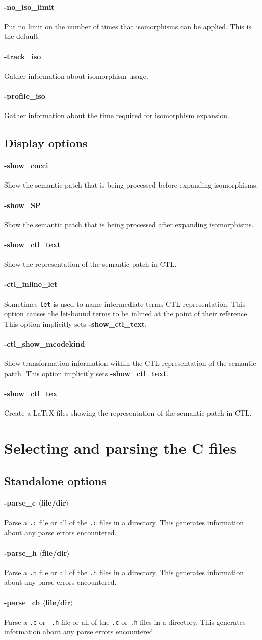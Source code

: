 \documentclass{article}
\newcommand{\normal}[2]{\paragraph*{\makebox[0in][r]{\BigLowerDiamond\,\,} {{#1}}} {#2}}
\newcommand{\rare}[2]{\paragraph*{\makebox[0in][r]{\BigDiamondshape\,\,} {{#1}}} {#2}}
\newcommand{\developer}[2]{\paragraph*{{#1}} {#2}}
\begin{document}
\rare{-no\_iso\_limit} Put no limit on the number of times that
isomorphisms can be applied. This is the default.

\developer{-track\_iso}{ Gather information about isomorphism usage.}

\developer{-profile\_iso}{ Gather information about the time required for
isomorphism expansion.}

\subsection{Display options}

\rare{-show\_cocci}{Show the semantic patch that is being processed before
  expanding isomorphisms.}

\rare{-show\_SP}{Show the semantic patch that is being processed after
  expanding isomorphisms.}

\rare{-show\_ctl\_text}{ Show the representation
of the semantic patch in CTL.}

\rare{-ctl\_inline\_let}{ Sometimes {\tt let} is used to name
intermediate terms CTL representation.  This option causes the let-bound
terms to be inlined at the point of their reference.
This option implicitly sets {\bf -show\_ctl\_text}.}

\rare{-ctl\_show\_mcodekind}{ Show
transformation information within the CTL representation
of the semantic patch. This option implicitly sets {\bf -show\_ctl\_text}.}

\rare{-show\_ctl\_tex}{ Create a LaTeX files showing the representation
of the semantic patch in CTL.}

\section{Selecting and parsing the C files}

\subsection{Standalone options}

\normal{-parse\_c $\langle$file/dir$\rangle$}{ Parse a {\tt .c} file or all
  of the {\tt .c} files in a directory.  This generates information about
  any parse errors encountered.}

\normal{-parse\_h $\langle$file/dir$\rangle$}{ Parse a {\tt .h} file or all
  of the {\tt .h} files in a directory.  This generates information about
  any parse errors encountered.}

\normal{-parse\_ch $\langle$file/dir$\rangle$}{ Parse a {\tt .c} or {\tt
    .h} file or all of the {\tt .c} or {\tt .h} files in a directory.  This
  generates information about any parse errors encountered.}
\end{document}
